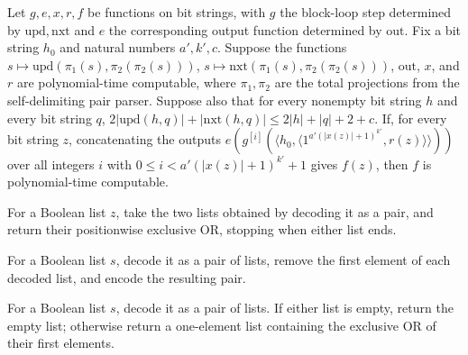 \begin{theorem}
\label{Complexity.BlockLoop.polyTimeComputable_countdown}
\leanok
{}
Let $g,e,x,r,f$ be functions on bit strings, with $g$ the block-loop step determined by
$\mathrm{upd},\mathrm{nxt}$ and $e$ the corresponding output function determined by
$\mathrm{out}$. Fix a bit string $h_0$ and natural numbers $a',k',c$. Suppose the
functions $s\mapsto\mathrm{upd}(\pi_1(s),\pi_2(\pi_2(s)))$,
$s\mapsto\mathrm{nxt}(\pi_1(s),\pi_2(\pi_2(s)))$, $\mathrm{out}$, $x$, and $r$ are
polynomial-time computable, where $\pi_1,\pi_2$ are the total projections from the
self-delimiting pair parser. Suppose also that for every nonempty bit string $h$ and
every bit string $q$, $2|\mathrm{upd}(h,q)|+|\mathrm{nxt}(h,q)|\le 2|h|+|q|+2+c$. If,
for every bit string $z$, concatenating the outputs $e(g^{[i]}(\langle h_0,\langle
1^{a'(|x(z)|+1)^{k'}},r(z)\rangle\rangle))$ over all integers $i$ with $0\le
i<a'(|x(z)|+1)^{k'}+1$ gives $f(z)$, then $f$ is polynomial-time computable.
\end{theorem}

\begin{definition}
\label{Complexity.xorD}
\leanok
{}
For a Boolean list $z$, take the two lists obtained by decoding it as a pair, and return
their positionwise exclusive OR, stopping when either list ends.
\end{definition}

\begin{definition}
\label{Complexity.xorPairStep}
\leanok
{}
For a Boolean list $s$, decode it as a pair of lists, remove the first element of each
decoded list, and encode the resulting pair.
\end{definition}

\begin{definition}
\label{Complexity.xorPairEmit}
\leanok
{}
For a Boolean list $s$, decode it as a pair of lists. If either list is empty, return
the empty list; otherwise return a one-element list containing the exclusive OR of their
first elements.
\end{definition}

